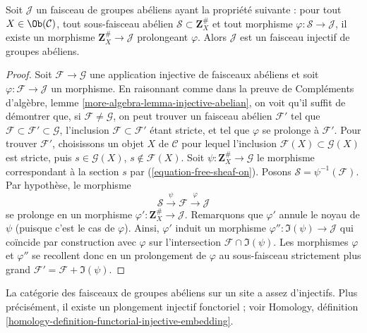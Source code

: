 \begin{lemma}
\label{lemma-characterize-injectives}
Soit $\mathcal{J}$ un faisceau de groupes abéliens ayant la propriété
suivante : pour tout $X\in \Ob(\mathcal{C})$, tout sous-faisceau abélien
$\mathcal{S} \subset \mathbf{Z}_X^\#$ et tout morphisme
$\varphi : \mathcal{S} \to \mathcal{J}$, il existe un morphisme
$\mathbf{Z}_X^\# \to \mathcal{J}$ prolongeant $\varphi$. Alors $\mathcal{J}$
est un faisceau injectif de groupes abéliens.
\end{lemma}

\begin{proof}
Soit $\mathcal{F} \to \mathcal{G}$ une application injective de faisceaux
abéliens et soit $\varphi : \mathcal{F} \to \mathcal{J}$ un morphisme.
En raisonnant comme dans la preuve de
Compléments d'algèbre, lemme \ref{more-algebra-lemma-injective-abelian}, on voit qu'il
suffit de démontrer que, si $\mathcal{F} \not = \mathcal{G}$, on peut trouver
un faisceau abélien $\mathcal{F}'$ tel que
$\mathcal{F} \subset \mathcal{F}' \subset \mathcal{G}$, l'inclusion
$\mathcal{F} \subset \mathcal{F}'$ étant stricte, et tel que $\varphi$ se
prolonge à $\mathcal{F}'$. Pour trouver $\mathcal{F}'$, choisissons un objet
$X$ de $\mathcal{C}$ pour lequel l'inclusion
$\mathcal{F}(X) \subset \mathcal{G}(X)$ est stricte, puis
$s \in \mathcal{G}(X)$, $s \not \in \mathcal{F}(X)$. Soit
$\psi : \mathbf{Z}_X^\# \to \mathcal{G}$ le morphisme correspondant à la
section $s$ par (\ref{equation-free-sheaf-on}). Posons
$\mathcal{S} = \psi^{-1}(\mathcal{F})$. Par hypothèse, le morphisme
$$
\mathcal{S} \xrightarrow{\psi} \mathcal{F} \xrightarrow{\varphi} \mathcal{J}
$$
se prolonge en un morphisme $\varphi' : \mathbf{Z}_X^\# \to \mathcal{J}$.
Remarquons que $\varphi'$ annule le noyau de $\psi$ (puisque c'est le cas de
$\varphi$). Ainsi, $\varphi'$ induit un morphisme
$\varphi'' : \Im(\psi) \to \mathcal{J}$ qui coïncide par construction avec
$\varphi$ sur l'intersection $\mathcal{F} \cap \Im(\psi)$. Les morphismes
$\varphi$ et $\varphi''$ se recollent donc en un prolongement de $\varphi$ au
sous-faisceau strictement plus grand
$\mathcal{F}' = \mathcal{F} + \Im(\psi)$.
\end{proof}

\begin{theorem}
\label{theorem-sheaves-injectives}
La catégorie des faisceaux de groupes abéliens sur un site a assez
d'injectifs. Plus précisément, il existe un plongement injectif fonctoriel ;
voir Homology, définition
\ref{homology-definition-functorial-injective-embedding}.
\end{theorem}

